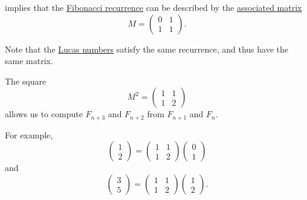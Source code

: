 \begin{example}\label{ex:fibonacci_matrix}
   implies that the \hyperref[def:fibonacci_numbers]{Fibonacci recurrence} can be described by the \hyperref[def:homogeneous_linear_recurrence_matrix]{associated matrix}
  \begin{equation*}
    M
    =
    \begin{pmatrix}
      0 & 1 \\
      1 & 1
    \end{pmatrix}.
  \end{equation*}

  Note that the \hyperref[def:lucas_numbers]{Lucas numbers} satisfy the same recurrence, and thus have the same matrix.

  \begin{thmenum}
     The square
    \begin{equation*}
      M^2
      =
      \begin{pmatrix}
        1 & 1 \\
        1 & 2
      \end{pmatrix}
    \end{equation*}
    allows us to compute \( F_{n+3} \) and \( F_{n+2} \) from \( F_{n+1} \) and \( F_n \).

    For example,
    \begin{equation*}
      \begin{pmatrix}
        1 \\ 2
      \end{pmatrix}
      =
      \begin{pmatrix}
        1 & 1 \\
        1 & 2
      \end{pmatrix}
      \begin{pmatrix}
        0 \\ 1
      \end{pmatrix}
    \end{equation*}
    and
    \begin{equation*}
      \begin{pmatrix}
        3 \\ 5
      \end{pmatrix}
      =
      \begin{pmatrix}
        1 & 1 \\
        1 & 2
      \end{pmatrix}
      \begin{pmatrix}
        1 \\ 2
      \end{pmatrix}.
    \end{equation*}


\end{thmenum}
\end{example}
